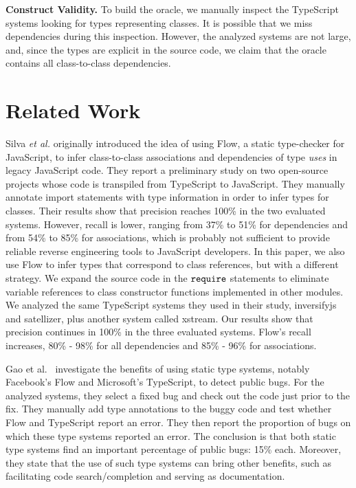 \documentclass[review]{elsarticle}
\newcommand{\mcode}[1]{$\tt #1$}
\begin{document}
\vspace{1.5 mm}

\noindent \textbf{Construct Validity.} To build the oracle, we manually inspect the TypeScript systems looking for types representing classes. It is possible that we miss dependencies during this inspection. However, the analyzed systems are not large, and, since the types are explicit in the source code, we claim that the oracle contains all class-to-class dependencies.  



\section{Related Work}
\label{sec:related-work}

Silva \emph{et al.} \cite{sanerera2017} originally introduced the idea of using Flow, a static type-checker for JavaScript, to infer class-to-class associations and dependencies of type \textit{uses} in legacy JavaScript code. They report a preliminary study on two open-source projects whose code is transpiled from TypeScript to JavaScript. They manually annotate import statements with type information in order to infer types for classes. Their results show that precision reaches 100\% in the two evaluated systems. However, recall is lower, ranging from 37\% to 51\% for dependencies and from 54\% to 85\% for associations, which is probably not sufficient to provide reliable reverse engineering tools to JavaScript developers. In this paper, we also use Flow to infer types that correspond to class references, but with a different strategy. We expand the source code in the \mcode{require} statements to eliminate variable references to class constructor functions implemented in other modules. We analyzed the same TypeScript systems they used in their study, {\sc inversifyjs} and {\sc satellizer}, plus another system called {\sc xstream}. Our results show that precision continues in 100\% in the three evaluated systems. Flow's recall increases, 80\% - 98\% for all dependencies and 85\% - 96\% for associations.

Gao et al.~\cite{Gao2017} investigate the benefits of using static type systems, notably Facebook's Flow and Microsoft's TypeScript, to detect public bugs. For the analyzed systems, they select a fixed bug and check out the code just prior to the fix. They manually add type annotations to the buggy code and test whether Flow and TypeScript report an error. They then report the proportion of bugs on which these type systems reported an error. The conclusion is that both static type systems find an important percentage of public bugs: 15\% each. Moreover, they state that the use of such type systems can bring other benefits, such as facilitating code search/completion and serving as documentation.
\end{document}

